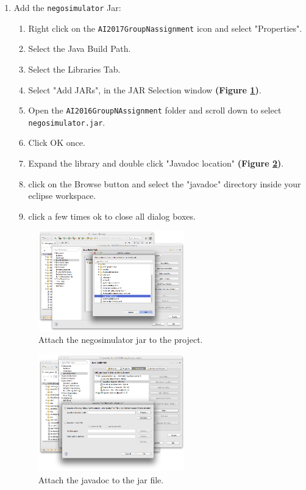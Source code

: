 \documentclass[]{article}
\begin{document}
\begin{enumerate}
\item{Add the \texttt{negosimulator} Jar:
	\begin{enumerate}
		\item Right click on the \texttt{AI2017GroupNassignment} icon and select "Properties".
		\item Select the Java Build Path.
		\item Select the Libraries Tab.
		\item Select "Add JARs", in the JAR Selection window \textbf{(Figure \ref{fig:run-genius-3})}.
		\item Open the \texttt{AI2016GroupNAssignment} folder and scroll down to select \texttt{negosimulator.jar}.
		\item Click OK once.
		
		\item Expand the library and double click "Javadoc location" \textbf{(Figure \ref{fig:attachjavadoc})}.
		\item click on the Browse button and select the "javadoc" directory inside your eclipse workspace.
		\item click a few times ok to close all dialog boxes.

	\end{enumerate}
	}
	
\begin{figure}[h!]
	\centering
		\includegraphics[width=0.6\textwidth]{media/selectjar.png}
		\caption{Attach the negosimulator jar to the project.}
	\label{fig:run-genius-3}
\end{figure}

\newpage


\begin{figure}[h!]
	\centering
		\includegraphics[width=0.6\textwidth]{media/setjavadoc.png}
		\caption{Attach the javadoc to the jar file.}
	\label{fig:attachjavadoc}
\end{figure}


\end{enumerate}
\end{document}
